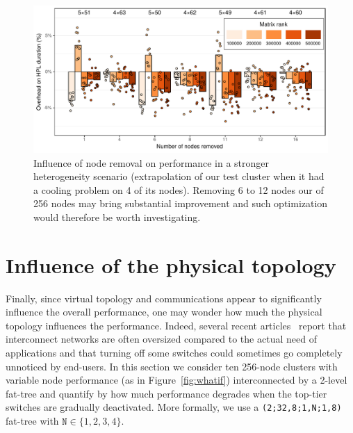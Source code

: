         \begin{figure}[htpb]
            \centering
            \includegraphics[width=\linewidth]{img/prediction/sensibility/spatial/whatif_removing_nodes_2_heterogeneous.pdf}
            \caption{Influence of node removal on performance in a stronger heterogeneity scenario (extrapolation of our
            test cluster when it had a cooling problem on 4 of its nodes). Removing 6 to 12 nodes our of 256 nodes may
            bring substantial improvement and such optimization would therefore be worth investigating.}
            \label{fig:whatif_removing_nodes_heterogeneous}
        \end{figure}

    \section{Influence of the physical topology}%
    \label{sec:influence_of_physical_topology}

        Finally, since virtual topology and communications appear to significantly influence the overall performance,
        one may wonder how much the physical topology influences the performance. Indeed, several recent
        articles~\cite{tapered_fat_tree_16,tapered_fat_tree_19} report that interconnect networks are often oversized
        compared to the actual need of applications and that turning off some switches could sometimes go completely
        unnoticed by end-users. In this section we consider ten 256-node clusters with variable node performance (as in
        Figure~\ref{fig:whatif}) interconnected by a 2-level fat-tree and quantify by how much performance degrades when
        the top-tier switches are gradually deactivated. More formally, we use a \texttt{(2;32,8;1,N;1,8)} fat-tree with
        \(\texttt{N}\in\{1,2,3,4\}\).

